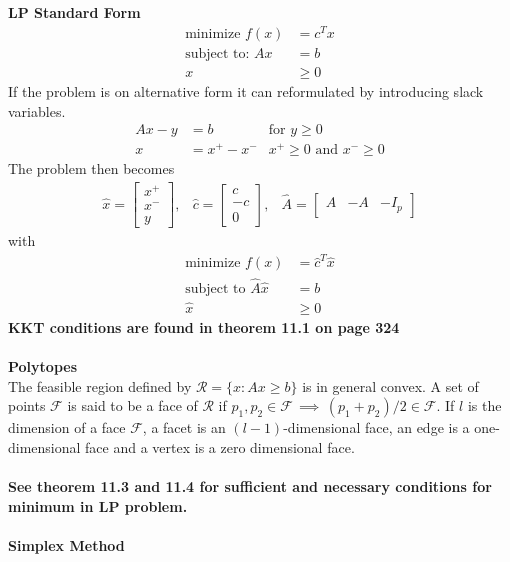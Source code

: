 \documentclass[12pt,a4paper]{report}
\begin{document}
\\\\
\textbf{LP Standard Form}
\begin{align*}
\text{minimize }f(x)&=c^Tx\\
\text{subject to: }Ax&=b\\
x&\geq0
\end{align*}
If the problem is on alternative form it can reformulated by introducing slack variables.
\begin{align*}
Ax-y&=b&\text{for }y\geq0\\
x&=x^+-x^-&x^+\geq0\text{ and }x^-\geq0
\end{align*}
The problem then becomes
\begin{align*}
\hat{x}=\begin{bmatrix}x^+\\x^-\\y\end{bmatrix},&\hat{c}=\begin{bmatrix}c\\-c\\0\end{bmatrix},&\hat{A}=\begin{bmatrix}A&-A&-I_p\end{bmatrix}
\end{align*}
with
\begin{align*}
\text{minimize }f(x)&=\hat{c}^T\hat{x}\\
\text{subject to }\hat{A}\hat{x}&=b\\
\hat{x}&\geq0
\end{align*}
\textbf{KKT conditions are found in theorem 11.1 on page 324}\\\\
\textbf{Polytopes}\\
The feasible region defined by $\mathcal{R}=\{x:Ax\geq b\}$ is in general convex. A set of points $\mathcal{F}$ is said to be a face of $\mathcal{R}$ if $p_1,p_2\in\mathcal{F}\,\implies\,(p_1+p_2)/2\in\mathcal{F}$. If $l$ is the dimension of a face $\mathcal{F}$, a facet is an $(l-1)$-dimensional face, an edge is a one-dimensional face and a vertex is a zero dimensional face.\\\\
\textbf{See theorem 11.3 and 11.4 for sufficient and necessary conditions for minimum in LP problem.}\\\\
\textbf{Simplex Method}\\
\end{document}
